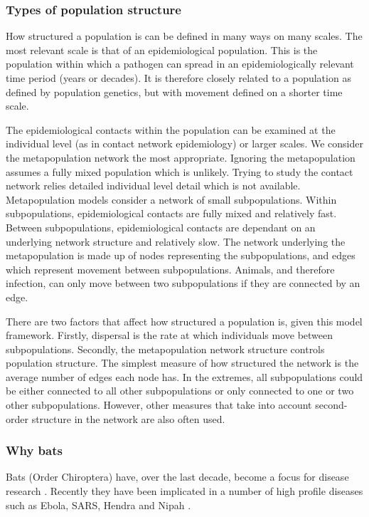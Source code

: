 \subsubsection{Types of population structure}

How structured a population is can be defined in many ways on many scales.
The most relevant scale is that of an epidemiological population.
This is the population within which a pathogen can spread in an epidemiologically relevant time period (years or decades).
It is therefore closely related to a population as defined by population genetics, but with movement defined on a shorter time scale.

The epidemiological contacts within the population can be examined at the individual level (as in contact network epidemiology) or larger scales.
We consider the metapopulation network the most appropriate.
Ignoring the metapopulation assumes a fully mixed population which is unlikely.
Trying to study the contact network relies detailed individual level detail which is not available.
Metapopulation models consider a network of small subpopulations. 
Within subpopulations, epidemiological contacts are fully mixed and relatively fast.
Between subpopulations, epidemiological contacts are dependant on an underlying network structure and relatively slow.
The network underlying the metapopulation is made up of nodes representing the subpopulations, and edges which represent movement between subpopulations.
Animals, and therefore infection, can only move between two subpopulations if they are connected by an edge.

There are two factors that affect how structured a population is, given this model framework.
Firstly, dispersal is the rate at which individuals move between subpopulations.
Secondly, the metapopulation network structure controls population structure.
The simplest measure of how structured the network is the average number of edges each node has.
In the extremes, all subpopulations could be either connected to all other subpopulations or only connected to one or two other subpopulations.
However, other measures that take into account second-order structure in the network are also often used.




\subsubsection{Why bats}
Bats (Order Chiroptera) have, over the last decade, become a focus for disease research  \cite{calisher2006bats, hughes2007emerging}.
Recently they have been implicated in a number of high profile diseases such as Ebola, SARS, Hendra and Nipah  \cite{calisher2006bats, li2005bats}.

